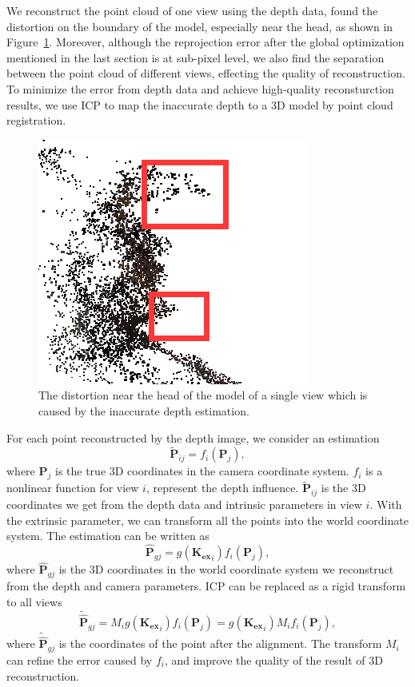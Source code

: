 \documentclass{article}
\begin{document}
We reconstruct the point cloud of one view using the depth data, found the distortion on the boundary of the model, especially near the head, as shown in Figure~\ref{fig:deptherror}. Moreover, although the reprojection error after the global optimization mentioned in the last section is at sub-pixel level, we also find the separation between the point cloud of different views, effecting the quality of reconstruction. To minimize the error from depth data and achieve high-quality reconsturction results, we use ICP to map the inaccurate depth to a 3D model by point cloud registration.
\begin{figure}[ht]
\centering
\includegraphics[scale=0.4]{image/depth_error.png}
\caption{The distortion near the head of the model of a single view which is caused by the inaccurate depth estimation.}
\label{fig:deptherror}
\end{figure}
For each point reconstructed by the depth image, we consider an estimation
\begin{equation}
\mathbf{\tilde{P}}_{ij}=f_{i}(\mathbf{P}_{j}),
\end{equation}
where $\mathbf{P}_{j}$ is the true 3D coordinates in the camera coordinate system. $f_{i}$ is a nonlinear function for view $i$, represent the depth influence. $\mathbf{\tilde{P}}_{ij}$ is the 3D coordinates we get from the depth data and intrinsic parameters in view $i$. With the extrinsic parameter, we can transform all the points into the world coordinate system. The estimation can be written as
\begin{equation}
\mathbf{\hat{P}}_{gj}=g(\mathbf{K_{ex}}_{i})f_{i}(\mathbf{P}_{j}),
\end{equation}
where $\mathbf{\hat{P}}_{gj}$ is the 3D coordinates in the world coordinate system we reconstruct from the depth and camera parameters. ICP can be replaced as a rigid transform to all views
\begin{equation}
\mathbf{\tilde{\hat{P}}}_{gj}=M_{i}g(\mathbf{K_{ex}}_{i})f_{i}(\mathbf{P}_{j})=g(\mathbf{K_{ex}}_{i})M_{i}f_{i}(\mathbf{P}_{j}),
\end{equation}
where $\mathbf{\tilde{\hat{P}}}_{gj}$ is the coordinates of the point after the alignment. The transform $M_{i}$ can refine the error caused by $f_{i}$, and improve the quality of the result of 3D reconstruction.
\end{document}
